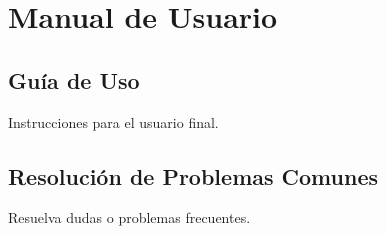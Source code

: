 	\chapter{Manual de Usuario}
	\section{Guía de Uso}
	Instrucciones para el usuario final.
	
	\section{Resolución de Problemas Comunes}
	Resuelva dudas o problemas frecuentes.
	
